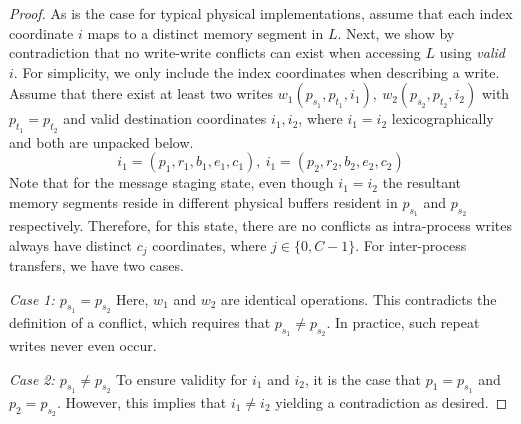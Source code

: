 \begin{proof}
    As is the case for typical physical implementations,
    assume that each index coordinate $i$ maps to a distinct memory segment in $L$.
    Next, we show by contradiction that no write-write conflicts can exist when accessing $L$ using \emph{valid} $i$.
    For simplicity, we only include the index coordinates when describing a write.
    Assume that there exist at least two writes $w_1(p_{s_1}, p_{t_1}, i_1),\>w_2(p_{s_2}, p_{t_2}, i_2)$
    with $p_{t_1} = p_{t_2}$ and valid destination coordinates
    $i_1, i_2$, where $i_1 = i_2$ lexicographically and both are unpacked below.
    \[
        i_1 = (p_1, r_1, b_1, e_1, c_1),\> i_1 = (p_2, r_2, b_2, e_2, c_2)
    \]
    Note that for the message staging state, even though $i_1 = i_2$ the resultant memory segments reside in
    different physical buffers resident in $p_{s_1}$ and $p_{s_2}$ respectively.
    Therefore, for this state, there are no conflicts as intra-process writes always have distinct $c_j$
    coordinates, where $j \in \{0, C - 1\}$.
    For inter-process transfers, we have two cases.

    \textit{Case 1: $p_{s_1} = p_{s_2}$}
    \newline Here, $w_1$ and $w_2$ are identical operations.
    This contradicts the definition of a conflict, which requires that $p_{s_1} \neq p_{s_2}$.
    In practice, such repeat writes never even occur.

    \textit{Case 2: $p_{s_1} \neq p_{s_2}$}
    \newline To ensure validity for $i_1$ and $i_2$, it is the case that $p_1 = p_{s_1}$ and $p_2 = p_{s_2}$.
    However, this implies that $i_1 \neq i_2$ yielding a contradiction as desired.
\end{proof}

